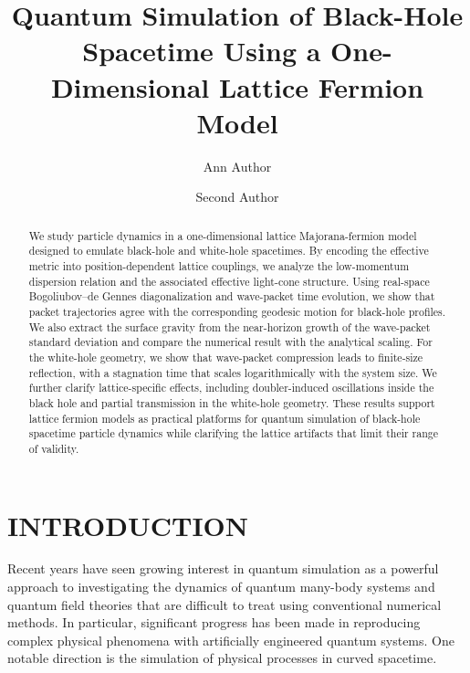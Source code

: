 \documentclass[reprint,amsmath,amssymb,aps,prb,showkeys]{revtex4-2}
\begin{document}
\title{Quantum Simulation of Black-Hole Spacetime Using a One-Dimensional Lattice Fermion Model}

\author{Ann Author}
\author{Second Author}%
%


\begin{abstract}
We study particle dynamics in a one-dimensional lattice Majorana-fermion model designed to emulate black-hole and white-hole spacetimes. By encoding the effective metric into position-dependent lattice couplings, we analyze the low-momentum dispersion relation and the associated effective light-cone structure. Using real-space Bogoliubov--de Gennes diagonalization and wave-packet time evolution, we show that packet trajectories agree with the corresponding geodesic motion for black-hole profiles. We also extract the surface gravity from the near-horizon growth of the wave-packet standard deviation and compare the numerical result with the analytical scaling. For the white-hole geometry, we show that wave-packet compression leads to finite-size reflection, with a stagnation time that scales logarithmically with the system size. We further clarify lattice-specific effects, including doubler-induced oscillations inside the black hole and partial transmission in the white-hole geometry. These results support lattice fermion models as practical platforms for quantum simulation of black-hole spacetime particle dynamics while clarifying the lattice artifacts that limit their range of validity.
\end{abstract}

\maketitle

\section{INTRODUCTION}
Recent years have seen growing interest in quantum simulation as a powerful approach to investigating the dynamics of quantum many-body systems and quantum field theories that are difficult to treat using conventional numerical methods\cite{RevModPhys.80.885,PhysRevLett.127.180501,Arute2019Quantum}. In particular, significant progress has been made in reproducing complex physical phenomena with artificially engineered quantum systems\cite{RevModPhys.86.153,Smith2019Simulating,Fauseweh2024Quantum}. One notable direction is the simulation of physical processes in curved spacetime.
\end{document}
